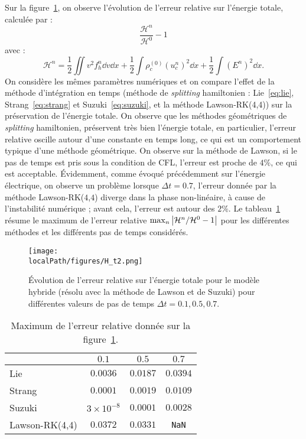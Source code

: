 Sur la figure~\ref{fig:H:t2}, on observe l'évolution de l'erreur relative sur l'énergie totale, calculée par :
\begin{equation}
	\frac{\mathcal{H}^n}{\mathcal{H}^0}-1
	\label{eq:relativeerror:H}
\end{equation}
avec :
$$
  \mathcal{H}^n = \frac{1}{2}\iint v^2f_h^n\dd{v}\dd{x}
                + \frac{1}{2}\int\rho_c^{(0)}\left(u_c^n\right)^2\dd{x}
                + \frac{1}{2}\int\left(E^n\right)^2\dd{x}.
$$
On considère les mêmes paramètres numériques et on compare l'effet de la méthode d'intégration en temps (méthode de \emph{splitting} hamiltonien : Lie~\eqref{eq:lie}, Strang~\eqref{eq:strang} et Suzuki~\eqref{eq:suzuki}, et la méthode Lawson-RK(4,4)) sur la préservation de l'énergie totale. On observe que les méthodes géométriques de \emph{splitting} hamiltonien, préservent très bien l'énergie totale, en particulier, l'erreur relative oscille autour d'une constante en temps long, ce qui est un comportement typique d'une méthode géométrique. On observe sur la méthode de Lawson, si le pas de temps est pris sous la condition de CFL, l'erreur est proche de $4\%$, ce qui est acceptable. Évidemment, comme évoqué précédemment sur l'énergie électrique, on observe un problème lorsque $\Delta t=0.7$, l'erreur donnée par la méthode Lawson-RK($4$,$4$) diverge dans la phase non-linéaire, à cause de l'instabilité numérique ; avant cela, l'erreur est autour des $2\%$. Le tableau~\ref{tab:H:max} résume le maximum de l'erreur relative $\max_n \left| {\cal H}^n / {\cal H}^0 -1 \right|$ pour les différentes méthodes et les différents pas de temps considérés.

\begin{figure}[h]
  \centering
  \texttt{[image: \\localPath/figures/H\_t2.png]}
  \caption{Évolution de l'erreur relative sur l'énergie totale pour le modèle hybride (résolu avec la méthode de Lawson et de Suzuki) pour différentes valeurs de pas de temps $\Delta t=0.1,0.5,0.7$.}
  \label{fig:H:t2}
\end{figure}

\begin{table}[h]
  \centering
  \begin{tabular}{l|c|c|c}
                   & $0.1$             & $0.5$     & $0.7$        \\
    \hline
    Lie            & $0.0036$          & $0.0187$  & $0.0394$     \\
    Strang         & $0.0001$          & $0.0019$  & $0.0109$     \\
    Suzuki         & $3\times 10^{-8}$ & $0.0001$  & $0.0028$     \\
    Lawson-RK(4,4) & $0.0372$          & $0.0331$  & \texttt{NaN} \\
  \end{tabular}
  \caption{Maximum de l'erreur relative donnée sur la figure~\ref{fig:H:t2}.}
  \label{tab:H:max}
\end{table}

